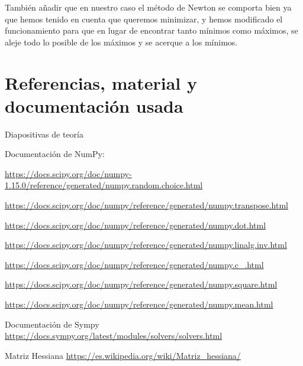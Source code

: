 \documentclass[12pt, spanish]{article}
\begin{document}
También añadir que en nuestro caso el método de Newton se comporta bien ya que hemos tenido en cuenta que queremos minimizar, y hemos modificado el funcionamiento para que en lugar de encontrar tanto mínimos como máximos, se aleje todo lo posible de los máximos y se acerque a los mínimos.


\newpage

\section{Referencias, material y documentación usada}


\begin{thebibliography}{9}

Diapositivas de teoría

Documentación de NumPy:

\url{https://docs.scipy.org/doc/numpy-1.15.0/reference/generated/numpy.random.choice.html}

\url{https://docs.scipy.org/doc/numpy/reference/generated/numpy.transpose.html}

\url{https://docs.scipy.org/doc/numpy/reference/generated/numpy.dot.html}

\url{https://docs.scipy.org/doc/numpy/reference/generated/numpy.linalg.inv.html}

\url{https://docs.scipy.org/doc/numpy/reference/generated/numpy.c_.html}

\url{https://docs.scipy.org/doc/numpy/reference/generated/numpy.square.html}

\url{https://docs.scipy.org/doc/numpy/reference/generated/numpy.mean.html}

Documentación de Sympy \url{https://docs.sympy.org/latest/modules/solvers/solvers.html}

Matriz Hessiana \url{https://es.wikipedia.org/wiki/Matriz_hessiana/}


\end{thebibliography}
\end{document}
